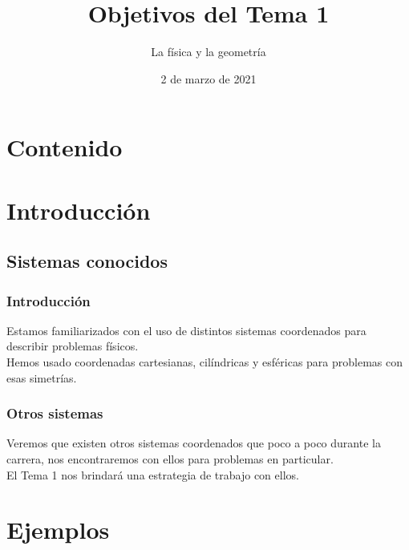 \documentclass[12pt]{beamer}
\date{2 de marzo de 2021}
\title{Objetivos del Tema 1}
\subtitle{La física y la geometría}
\begin{document}
\maketitle
\fontsize{14}{14}\selectfont
{}
\section*{Contenido}
\section{Introducción}
\subsection{Sistemas conocidos}
\begin{frame}
\frametitle{Introducción}
Estamos familiarizados con el uso de distintos sistemas coordenados para describir problemas físicos.
\\
\bigskip
Hemos usado coordenadas cartesianas, cilíndricas y esféricas para problemas con esas simetrías.
\end{frame}
\begin{frame}
\frametitle{Otros sistemas}
Veremos que existen otros sistemas coordenados que poco a poco durante la carrera, nos encontraremos con ellos para problemas en particular.
\\
\bigskip
\pause
El Tema 1 nos brindará una estrategia de trabajo con ellos.
\end{frame}
\section{Ejemplos}
\end{document}
